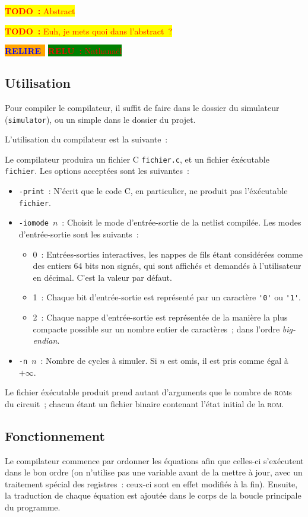 \documentclass[11pt,a4paper]{article}
\newcommand{\todo}[1]{\colorbox{yellow}{\textcolor{red}{\textbf{TODO~:} #1}}}
\newcommand{\relire}{\colorbox{orange}{\textcolor{blue}{\textbf{RELIRE}~}}}
\newcommand{\relu}[1]{\colorbox{green}{\textcolor{red}{\textbf{RELU~:} #1}}}
\begin{document}
\todo{Abstract}

\todo{Euh, je mets quoi dans l'abstract~?}

\relire
\relu{Nathanaël}

\subsection{Utilisation}

Pour compiler le compilateur, il suffit de faire
 dans le dossier du simulateur
(\verb!simulator!), ou un simple  dans le dossier du
projet.

L'utilisation du compilateur est la suivante~:


Le compilateur produira un fichier C \verb!fichier.c!, et un fichier
éxécutable \verb!fichier!. Les options acceptées sont les suivantes~:
\begin{itemize}
\item{\verb!-print!~: N'écrit que le code C, en particulier, ne
    produit pas l'éxécutable \verb!fichier!.}
\item{\verb!-iomode!~$n$~: Choisit le mode d'entrée-sortie de la
    netlist compilée. Les modes d'entrée-sortie sont les suivants~:
    \begin{itemize}
    \item{0~: Entrées-sorties interactives, les nappes de fils étant
        considérées comme des entiers 64 bits non signés, qui sont
        affichés et demandés à l'utilisateur en décimal. C'est la
        valeur par défaut.}
    \item{1~: Chaque bit d'entrée-sortie est représenté par un
        caractère \verb!'0'! ou \verb!'1'!.}
    \item{2~: Chaque nappe d'entrée-sortie est représentée de la
        manière la plus compacte possible sur un nombre entier de
        caractères~; dans l'ordre \textit{big-endian}.}
    \end{itemize}
}
\item{\verb!-n!~$n$~: Nombre de cycles à simuler. Si $n$ est omis, il
    est pris comme égal à $+\infty$.}
\end{itemize}

Le fichier éxécutable produit prend autant d'arguments que le nombre
de \textsc{rom}s du circuit~; chacun étant un fichier binaire
contenant l'état initial de la \textsc{rom}.

\subsection{Fonctionnement}
Le compilateur commence par ordonner les équations afin que celles-ci
s'exécutent dans le bon ordre (on n'utilise pas une variable avant de
la mettre à jour, avec un traitement spécial des registres~: ceux-ci
sont en effet modifiés à la fin). Ensuite, la traduction de chaque
équation est ajoutée dans le corps de la boucle principale du
programme.
\end{document}
